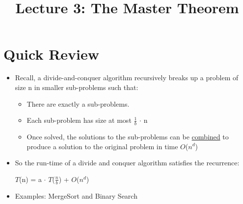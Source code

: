 \documentclass[12pt]{article}
\title{\huge Lecture 3: The Master Theorem}
\author{}
\date{}
\begin{document}
\maketitle
\section{Quick Review}
\renewcommand{\labelitemii}{$\circ$}
\renewcommand{\labelitemiii}{$\cdot$}
\renewcommand{\labelitemiii}{$\rightarrow$}
\begin{itemize}
\item Recall, a divide-and-conquer algorithm recursively breaks up a problem of size n in smaller sub-problems such that:
	\begin{itemize}
	\item There are exactly a sub-problems.
	\item Each sub-problem has size at most $\frac{1}{b}$ $\cdot$ n
	\item Once solved, the solutions to the sub-problems can be \underline{combined} to produce 	a solution to the original problem in time $O$($n^d$)
	\end{itemize}
\item So the run-time of a divide and conquer algorithm satisfies the recurrence:

\hspace*{\fill}\large{$T$(n) = a $\cdot$ $T$($\frac{n}{b}$) + $O$($n^d$)} \hspace*{\fill} 

\item Examples: MergeSort and Binary Search
\end{itemize}
\end{document}
